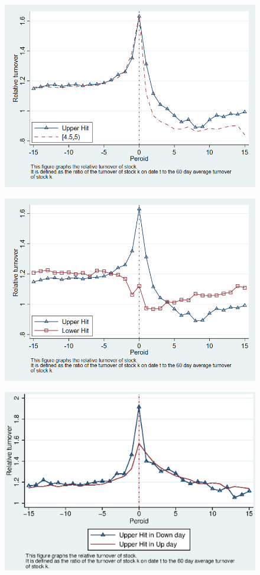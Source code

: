 \documentclass[12pt]{article}
\begin{document}
\begin{figure}[htbp]
\centering
\includegraphics[width=0.7\linewidth]{CURT}
\caption{}
\label{fig:curt}
\end{figure}




\begin{figure}[htbp]
\centering
\includegraphics[width=0.7\linewidth]{RT}
\caption{}
\label{fig:rt}
\end{figure}

\begin{figure}[htbp]
\centering
\includegraphics[width=0.7\linewidth]{UPNRT.eps}
\caption{}
\label{fig:UPNRT}
\end{figure}
\end{document}
